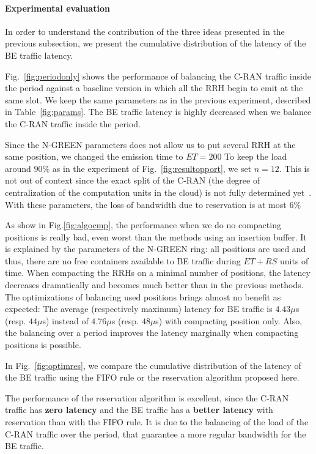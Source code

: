 \documentclass[10pt, conference, letterpaper]{IEEEtran}
\begin{document}
  \paragraph{Experimental evaluation}

  In order to understand the contribution of the three ideas presented in the previous subsection,
   we present the cumulative distribution of the latency of the BE traffic latency.
   
Fig.~\ref{fig:periodonly} shows the performance of balancing the C-RAN traffic inside the period against a baseline version in which all the RRH begin to emit at the same slot. We keep the same parameters as in the previous experiment, described in Table~\ref{fig:params}. The BE traffic latency is highly decreased when we balance the C-RAN traffic inside the period.

 Since the N-GREEN parameters does not allow us to put several RRH at the same position, we changed the emission time to $ET = 200$ To keep the load around $90\%$ as in the experiment of Fig.~\ref{fig:resultopport}, we set $n = 12$. This is not out of context since the exact split of the C-RAN (the degree of centralization of the computation units in the cloud) is not fully determined yet~\cite{mobile2011c}. With these parameters, the loss of bandwidth due to reservation is at most $6\%$

As show in Fig.\ref{fig:algocmp}, the performance when we do no compacting positions is really bad, even worst than the methods using an insertion buffer. It is explained by the parameters of the N-GREEN ring: all positions are used and thus, there are no free containers available to BE traffic during $ET+RS$ units of time. When compacting the RRHs on a minimal number of positions, the latency decreases dramatically and becomes much better than in the previous methods. The optimizations of balancing used positions brings almost no benefit as expected: The average (respectively maximum) latency for BE traffic is $4.43\mu$s (resp. $44\mu$s) instead of $4.76\mu$s (resp. $48\mu$s) with compacting position only. Also, the balancing over a period improves the latency marginally when compacting positions is possible. 


In Fig.~\ref{fig:optimres}, we compare the cumulative distribution of the latency of the BE traffic using the FIFO rule or the reservation algorithm proposed here. 

  The performance of the reservation algorithm is excellent, since the C-RAN traffic has {\bf zero latency} and the BE traffic has a \textbf{better latency} with reservation than with the FIFO rule. It is due to the balancing of the load of the C-RAN traffic over the period, that guarantee a more regular bandwidth for the BE traffic.
  
\end{document}
